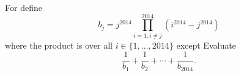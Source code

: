 For  define \[b_j=j^{2014}\prod_{i=1, i\neq j}^{2014}(i^{2014}-j^{2014})\] where the product is over all $i\in\{1,\ldots,2014\}$ except   Evaluate \[\dfrac1{b_1}+\dfrac1{b_2}+\cdots+\dfrac1{b_{2014}}.\]